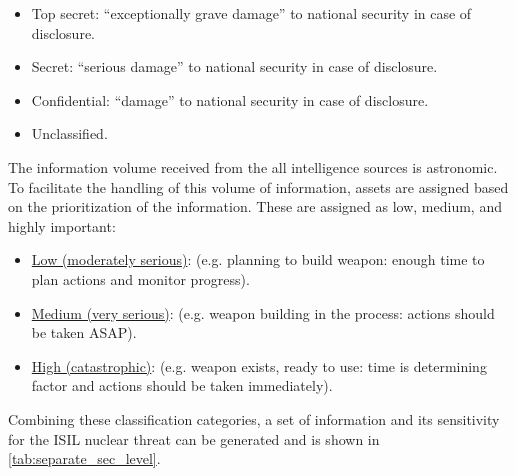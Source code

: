 \documentclass{report}
\begin{document}
\begin{itemize}
  \item Top secret: \enquote{exceptionally grave damage} to national security in case of disclosure.
  \item Secret: \enquote{serious damage} to national security in case of disclosure.
  \item Confidential: \enquote{damage} to national security in case of disclosure.
  \item Unclassified.
\end{itemize}

The information volume received from the all intelligence sources is astronomic. To facilitate the handling of this volume of information, assets are assigned based on the prioritization of the information. These are assigned as low, medium, and highly important:

\begin{itemize}
  \item \underline{Low (moderately serious)}: (e.g. planning to build weapon: enough time to plan actions and monitor progress).
  \item \underline{Medium (very serious)}: (e.g. weapon building in the process: actions should be taken ASAP).
  \item \underline{High (catastrophic)}: (e.g. weapon exists, ready to use: time is determining factor and actions should be taken immediately).
\end{itemize}

Combining these classification categories, a set of information and its sensitivity for the ISIL nuclear threat can be generated and is shown in \autoref{tab:separate_sec_level}.  

\end{document}
